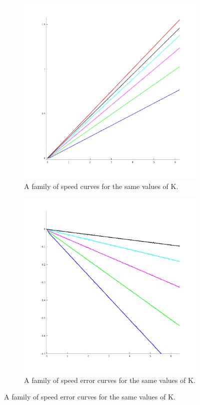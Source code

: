 \documentclass[11pt,a4paper]{article}
\begin{document}
\begin{enumerate}
\begin{figure}[h!]
	\centering
	\begin{subfigure}{.5\textwidth}
		\centering
		\includegraphics[width = \textwidth]{imglab/lab4sol_rampspeedkfam.png}
		\caption{A family of speed curves for the same values of K.}
	\end{subfigure}%
	\begin{subfigure}{.5\textwidth}
		\centering
		\includegraphics[width = \textwidth]{imglab/lab4sol_rampspeederr.png}
		\caption{A family of speed error curves for the same values of K.}	
	\end{subfigure}
\end{figure}


\end{enumerate}
\end{document}
